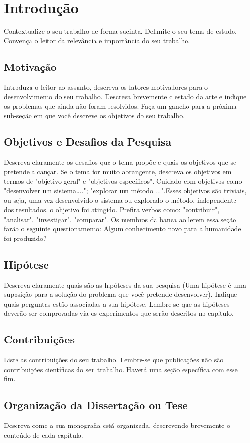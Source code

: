\chapter[Introdução]{Introdução}

Contextualize o seu trabalho de forma sucinta. 
Delimite o seu tema de estudo. 
Convença o leitor da relevância e importância do seu trabalho. \cite{tinoco2022wildfire}

\section{Motivação}
Introduza o leitor ao assunto, descreva os fatores motivadores para o desenvolvimento do seu trabalho.   Descreva brevemente o estado da arte e indique os problemas que ainda não foram resolvidos. Faça um gancho para a próxima sub-seção em que você descreve os  objetivos do seu trabalho. 

\section{Objetivos e Desafios da Pesquisa}
Descreva claramente os desafios que o tema propõe e quais os  objetivos que se pretende alcançar. Se o tema for muito abrangente, descreva os objetivos em termos de "objetivo geral" e  "objetivos específicos". Cuidado com objetivos como "desenvolver um sistema...."; "explorar um método ...".Esses objetivos são triviais, ou seja, uma vez desenvolvido o sistema ou explorado o método, independente dos resultados, o objetivo foi atingido. Prefira verbos como: "contribuir", "analisar", "investigar", "comparar". Os membros da banca ao lerem essa seção farão o seguinte questionamento: Algum conhecimento novo para a humanidade foi produzido?


\section{Hipótese}
Descreva claramente quais são as hipóteses da sua pesquisa (Uma hipótese é uma suposição para a solução do problema que você pretende desenvolver). Indique quais perguntas estão associadas a sua hipótese. Lembre-se que as hipóteses deverão ser comprovadas via os experimentos que serão descritos no capítulo.

\section{Contribuições}
Liste as contribuições do seu trabalho. Lembre-se que publicações não são contribuições científicas do seu trabalho. Haverá uma seção específica com esse fim.

\section{Organização da Dissertação ou Tese}
Descreva como a sua monografia está organizada, descrevendo brevemente o conteúdo de cada capítulo.